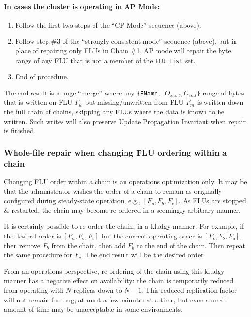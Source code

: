 \documentclass[preprint,10pt]{sigplanconf}
\begin{document}
\paragraph{In cases the cluster is operating in AP Mode:}

\begin{enumerate}
\item Follow the first two steps of the ``CP Mode''
  sequence (above).
\item Follow step \#3 of the ``strongly consistent mode'' sequence
  (above), but in place of repairing only FLUs in Chain \#1, AP mode
  will repair the byte range of any FLU that is not a member of the
  {\tt FLU\_List} set.
\item End of procedure.
\end{enumerate}

The end result is a huge ``merge'' where any
{\tt \{FName, $O_{start}, O_{end}$\}} range of bytes that is written
on FLU $F_w$ but missing/unwritten from FLU $F_m$ is written down the full chain
of chains, skipping any FLUs where the data is known to be written.
Such writes will also preserve Update Propagation Invariant when
repair is finished.

\subsubsection{Whole-file repair when changing FLU ordering within a chain}
\label{sub:repair-chain-re-ordering}

Changing FLU order within a chain is an operations optimization only.
It may be that the administrator wishes the order of a chain to remain
as originally configured during steady-state operation, e.g.,
$[F_a,F_b,F_c]$.  As FLUs are stopped \& restarted, the chain may
become re-ordered in a seemingly-arbitrary manner.

It is certainly possible to re-order the chain, in a kludgy manner.
For example, if the desired order is $[F_a,F_b,F_c]$ but the current
operating order is $[F_c,F_b,F_a]$, then remove $F_b$ from the chain,
then add $F_b$ to the end of the chain.  Then repeat the same
procedure for $F_c$.  The end result will be the desired order.

From an operations perspective, re-ordering of the chain
using this kludgy manner has a
negative effect on availability: the chain is temporarily reduced from
operating with $N$ replicas down to $N-1$.  This reduced replication
factor will not remain for long, at most a few minutes at a time, but
even a small amount of time may be unacceptable in some environments.
\end{document}
